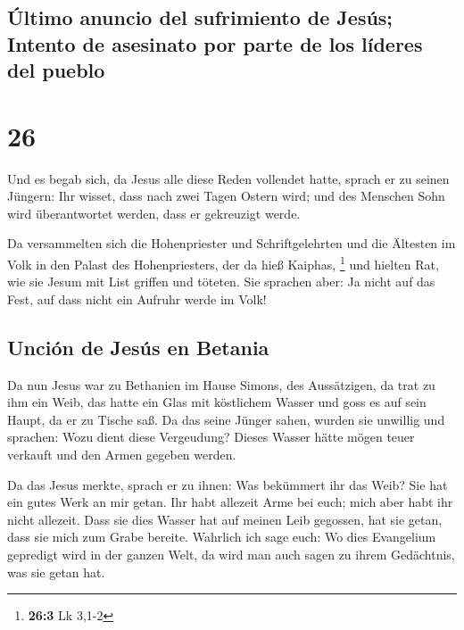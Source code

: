 \hypertarget{uxfaltimo-anuncio-del-sufrimiento-de-jesuxfas-intento-de-asesinato-por-parte-de-los-luxedderes-del-pueblo}{%
\subsection{Último anuncio del sufrimiento de Jesús; Intento de
asesinato por parte de los líderes del
pueblo}\label{uxfaltimo-anuncio-del-sufrimiento-de-jesuxfas-intento-de-asesinato-por-parte-de-los-luxedderes-del-pueblo}}

\hypertarget{section-25}{%
\section{26}\label{section-25}}

 Und es begab sich, da Jesus alle diese Reden vollendet
hatte, sprach er zu seinen Jüngern:  Ihr wisset, dass nach
zwei Tagen Ostern wird; und des Menschen Sohn wird überantwortet werden,
dass er gekreuzigt werde.

 Da versammelten sich die Hohenpriester und
Schriftgelehrten und die Ältesten im Volk in den Palast des
Hohenpriesters, der da hieß Kaiphas, \footnote{\textbf{26:3} Lk 3,1-2}
 und hielten Rat, wie sie Jesum mit List griffen und
töteten.  Sie sprachen aber: Ja nicht auf das Fest, auf
dass nicht ein Aufruhr werde im Volk!

\hypertarget{unciuxf3n-de-jesuxfas-en-betania}{%
\subsection{Unción de Jesús en
Betania}\label{unciuxf3n-de-jesuxfas-en-betania}}

 Da nun Jesus war zu Bethanien im Hause Simons, des
Aussätzigen,  da trat zu ihm ein Weib, das hatte ein Glas
mit köstlichem Wasser und goss es auf sein Haupt, da er zu Tische saß.
 Da das seine Jünger sahen, wurden sie unwillig und
sprachen: Wozu dient diese Vergeudung?  Dieses Wasser
hätte mögen teuer verkauft und den Armen gegeben werden.

 Da das Jesus merkte, sprach er zu ihnen: Was bekümmert
ihr das Weib? Sie hat ein gutes Werk an mir getan.  Ihr
habt allezeit Arme bei euch; mich aber habt ihr nicht allezeit.
 Dass sie dies Wasser hat auf meinen Leib gegossen, hat
sie getan, dass sie mich zum Grabe bereite.  Wahrlich ich
sage euch: Wo dies Evangelium gepredigt wird in der ganzen Welt, da wird
man auch sagen zu ihrem Gedächtnis, was sie getan hat.

